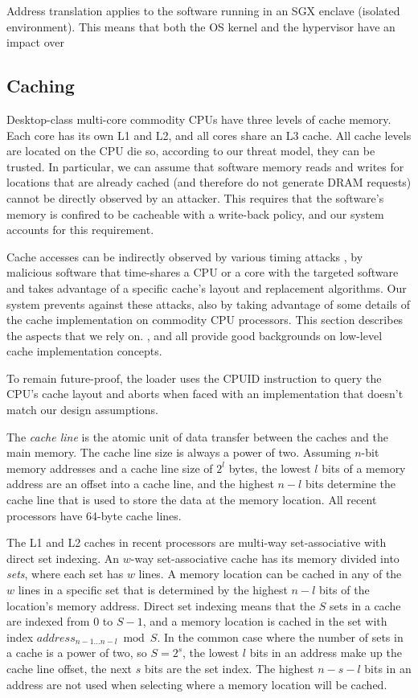 Address translation applies to the software running in an SGX enclave
(isolated environment). This means that both the OS kernel and the hypervisor
have an impact over


\subsection{Caching}
\label{sec:caching}

Desktop-class multi-core commodity CPUs have three levels of cache memory. Each
core has its own L1 and L2, and all cores share an L3 cache. All cache levels
are located on the CPU die so, according to our threat model, they can be
trusted. In particular, we can assume that software memory reads and writes for
locations that are already cached (and therefore do not generate DRAM requests)
cannot be directly observed by an attacker. This requires that the software's
memory is confired to be cacheable with a write-back policy, and our system
accounts for this requirement.

Cache accesses can be indirectly observed by various timing attacks
\cite{banescu2011cache}, by malicious software that time-shares a CPU or a core
with the targeted software and takes advantage of a specific cache's layout
and replacement algorithms. Our system prevents against these attacks, also by
taking advantage of some details of the cache implementation on commodity CPU
processors. This section describes the aspects that we rely on.
\cite{smith1982cache}, \cite{patterson2013architecture} and
\cite{hennessy2012architecture} all provide good backgrounds on low-level cache
implementation concepts.

To remain future-proof, the loader uses the CPUID instruction
\cite{intel2013manual} to query the CPU's cache layout and aborts when faced
with an implementation that doesn't match our design assumptions.

The \textit{cache line} is the atomic unit of data transfer between the caches
and the main memory. The cache line size is always a power of two. Assuming
$n$-bit memory addresses and a cache line size of $2^{l}$ bytes, the lowest
$l$ bits of a memory address are an offset into a cache line, and the highest
$n - l$ bits determine the cache line that is used to store the data at the
memory location. All recent processors have 64-byte cache lines.

The L1 and L2 caches in recent processors are multi-way set-associative with
direct set indexing. An $w$-way set-associative cache has its memory divided
into \textit{sets}, where each set has $w$ lines. A memory location can be
cached in any of the $w$ lines in a specific set that is determined by the
highest $n - l$ bits of the location's memory address. Direct set indexing
means that the $S$ sets in a cache are indexed from $0$ to $S - 1$, and a
memory location is cached in the set with index
$address_{n - 1 \ldots n - l} \bmod S$. In the common case where the number of
sets in a cache is a power of two, so $S = 2^{s}$, the lowest $l$ bits in an
address make up the cache line offset, the next $s$ bits are the set index.
The highest $n - s - l$ bits in an address are not used when selecting where a
memory location will be cached.

